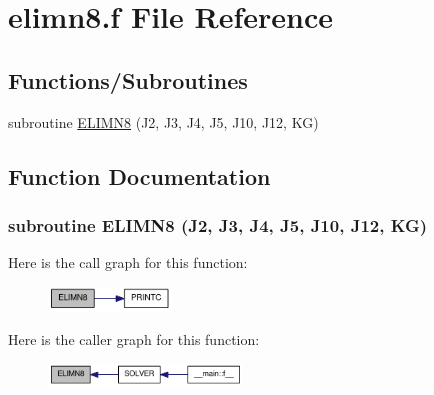 \hypertarget{elimn8_8f}{
\section{elimn8.f File Reference}
\label{elimn8_8f}
}
\subsection*{Functions/Subroutines}
\begin{DoxyCompactItemize}
\item 
subroutine \hyperlink{elimn8_8f_aa995a2d61851dc43efb4d12e52c474d4}{ELIMN8} (J2, J3, J4, J5, J10, J12, KG)
\end{DoxyCompactItemize}


\subsection{Function Documentation}
\hypertarget{elimn8_8f_aa995a2d61851dc43efb4d12e52c474d4}{
\subsubsection[{ELIMN8}]{\setlength{\rightskip}{0pt plus 5cm}subroutine ELIMN8 (J2, \/  J3, \/  J4, \/  J5, \/  J10, \/  J12, \/  KG)}}
\label{elimn8_8f_aa995a2d61851dc43efb4d12e52c474d4}


Here is the call graph for this function:\nopagebreak
\begin{figure}[H]
\begin{center}
\leavevmode
\includegraphics[width=93pt]{elimn8_8f_aa995a2d61851dc43efb4d12e52c474d4_cgraph}
\end{center}
\end{figure}


Here is the caller graph for this function:\nopagebreak
\begin{figure}[H]
\begin{center}
\leavevmode
\includegraphics[width=146pt]{elimn8_8f_aa995a2d61851dc43efb4d12e52c474d4_icgraph}
\end{center}
\end{figure}
